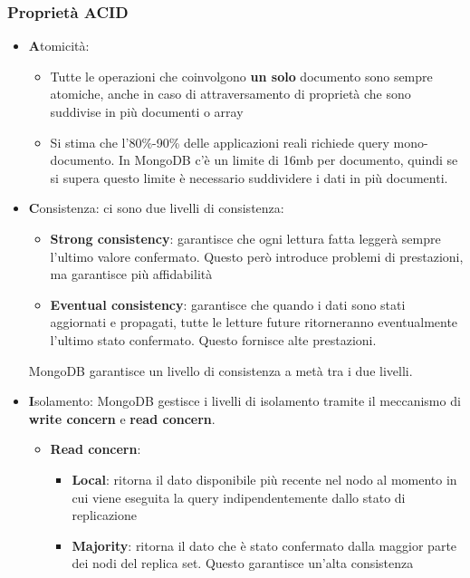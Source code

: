 \documentclass[a4paper]{article}
\begin{document}
\subsubsection{Proprietà ACID}
\begin{itemize}
  \item \textbf{A}tomicità: 
    \begin{itemize}
      \item Tutte le operazioni che coinvolgono \textbf{un solo} documento
        sono sempre atomiche, anche in caso di attraversamento di proprietà che sono
        suddivise in più documenti o array

      \item Si stima che l'80\%-90\% delle applicazioni reali richiede query mono-documento.
        In MongoDB c'è un limite di 16mb per documento, quindi se si supera questo limite
        è necessario suddividere i dati in più documenti.
    \end{itemize}

  \item \textbf{C}onsistenza: ci sono due livelli di consistenza:
    \begin{itemize}
      \item \textbf{Strong consistency}: garantisce che ogni lettura fatta leggerà
        sempre l'ultimo valore confermato. Questo però introduce problemi di
        prestazioni, ma garantisce più affidabilità

      \item \textbf{Eventual consistency}: garantisce che quando i dati sono stati
        aggiornati e propagati, tutte le letture future ritorneranno eventualmente
        l'ultimo stato confermato. Questo fornisce alte prestazioni.
    \end{itemize}
    MongoDB garantisce un livello di consistenza a metà tra i due livelli.

  \item \textbf{I}solamento: MongoDB gestisce i livelli di isolamento tramite il
    meccanismo di \textbf{write concern} e \textbf{read concern}.
    \begin{itemize}
      \item \textbf{Read concern}:
        \begin{itemize}
          \item \textbf{Local}: ritorna il dato disponibile più recente nel nodo al momento in
            cui viene eseguita la query indipendentemente dallo stato di replicazione

          \item \textbf{Majority}: ritorna il dato che è stato confermato dalla maggior parte
            dei nodi del replica set. Questo garantisce un'alta consistenza


\end{itemize}
\end{itemize}
\end{itemize}
\end{document}
